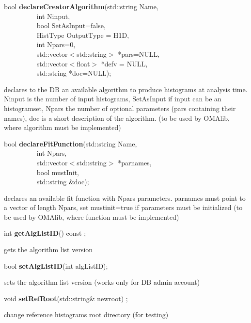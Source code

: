 \item    bool {\bf declareCreatorAlgorithm}(std::string Name,\\\mbox{}~~~~~~~~~ 
			       int Ninput,\\\mbox{}~~~~~~~~~
			       bool SetAsInput=false,\\\mbox{}~~~~~~~~~
			       HistType OutputType = H1D,\\\mbox{}~~~~~~~~~
			       int Npars=0,\\\mbox{}~~~~~~~~~ 
			       std::vector$<$std::string$>$ *pars=NULL,\\\mbox{}~~~~~~~~~
			       std::vector$<$float$>$ *defv = NULL,\\\mbox{}~~~~~~~~~
			       std::string *doc=NULL);

 declares to the DB an available algorithm to produce histograms at
 analysis time. Ninput is the number of input histograms, SetAsInput
 if input can be an histogramset, Npars the
 number of optional parameters (pars containing their names), doc is a short
 description of the algorithm.
 (to be used by OMAlib, where algorithm must be implemented)


\item    bool {\bf declareFitFunction}(std::string Name,\\\mbox{}~~~~~~~~~ 
                          int Npars,\\\mbox{}~~~~~~~~~
                          std::vector$<$std::string$>$ *parnames,\\\mbox{}~~~~~~~~~
                          bool mustInit,\\\mbox{}~~~~~~~~~
                          std::string \&doc);

 declares an available fit function with Npars parameters. parnames must point to a vector
 of length Npars, set mustinit=true if parameters must be initialized
 (to be used by OMAlib, where function must be implemented)


\item    int {\bf getAlgListID}() const ;

 gets the algorithm list version


\item    bool {\bf setAlgListID}(int algListID);


 sets the algorithm list version (works only for DB admin account)


\item    void {\bf setRefRoot}(std::string\& newroot) ;

 change reference histograms root directory (for testing)


